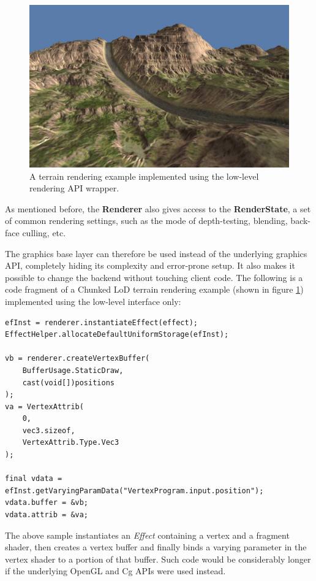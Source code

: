 \begin{figure}[h!]
  \centering
    \includegraphics[width=0.9\linewidth]{./Figures/terrainRendering.jpg}
    \caption[terrainRendering]{A terrain rendering example implemented using the low-level rendering API wrapper.}
  \label{fig:terrainRendering}
\end{figure}

As mentioned before, the \textbf{Renderer} also gives access to the \textbf{RenderState}, a set of common rendering settings, such as the mode of depth-testing, blending, back-face culling, etc.

The graphics base layer can therefore be used instead of the underlying graphics API, completely hiding its complexity and error-prone setup. It also makes it possible to change the backend without touching client code. The following is a code fragment of a Chunked LoD \cite{chunkedLoD} terrain rendering example (shown in figure \ref{fig:terrainRendering}) implemented using the low-level interface only:
\begin{lstlisting}[frame=single]
efInst = renderer.instantiateEffect(effect);
EffectHelper.allocateDefaultUniformStorage(efInst);

vb = renderer.createVertexBuffer(
	BufferUsage.StaticDraw,
	cast(void[])positions
);
va = VertexAttrib(
	0,
	vec3.sizeof,
	VertexAttrib.Type.Vec3
);

final vdata = efInst.getVaryingParamData("VertexProgram.input.position");
vdata.buffer = &vb;
vdata.attrib = &va;
\end{lstlisting}
The above sample instantiates an \emph{Effect} containing a vertex and a fragment shader, then creates a vertex buffer and finally binds a varying parameter in the vertex shader to a portion of that buffer. Such code would be considerably longer if the underlying OpenGL and Cg APIs were used instead.
	
